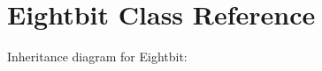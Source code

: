 \hypertarget{classEightbit}{}\section{Eightbit Class Reference}
\label{classEightbit}


Inheritance diagram for Eightbit\+:
